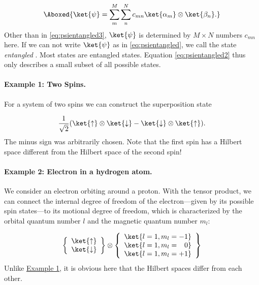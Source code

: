 \begin{align}
				\Aboxed{\ket{\psi}=\sum_m^M \sum_n^N c_{mn}\ket{\alpha_m}\otimes \ket{\beta_n}.}
			
\end{align}
						Other than in \eqref{eq:psientangled3}, $\ket{\psi}$ is determined by $M \times N$ numbers $c_{mn}$ here. If we can not write $\ket{\psi}$ as in \eqref{eq:psientangled}, we call the state \emph{entangled} . Most states are entangled states. Equation \eqref{eq:psientangled2} thus only describes a small subset of all possible states.

\paragraph{Example 1: Two Spins.}\label{sec:examplespin}  For a system of two spins we can construct the superposition state

\begin{align}
						\frac{1}{\sqrt{2}}(\ket{\uparrow}\otimes\ket{\downarrow}-\ket{\downarrow}\otimes\ket{\uparrow}).
					
\end{align}
					The minus sign was arbitrarily chosen.
					Note that the first spin has a Hilbert space different from the Hilbert space of the second spin!
				\paragraph{Example 2: Electron in a hydrogen atom.} We consider an electron orbiting around a proton. With the tensor product, we can connect the internal degree of freedom of the electron---given by its possible spin states---to its motional degree of freedom, which is characterized by the orbital quantum number $l$ and the magnetic quantum number $m_l$:

\begin{align}
						\left\{

\begin{array}
{c} \ket{\uparrow} \\ \ket{\downarrow} \end{array}
 \right\} \otimes \left\{

\begin{array}
{c} \ket{l=1,m_l=-1} \\ \ket{l=1,m_l=\enspace \; 0} \\ \ket{l=1,m_l=+1}  \end{array}
 \right\}
					
\end{align}
										Unlike \hyperref[sec:examplespin]{Example 1}, it is obvious here that the Hilbert spaces differ from each other.